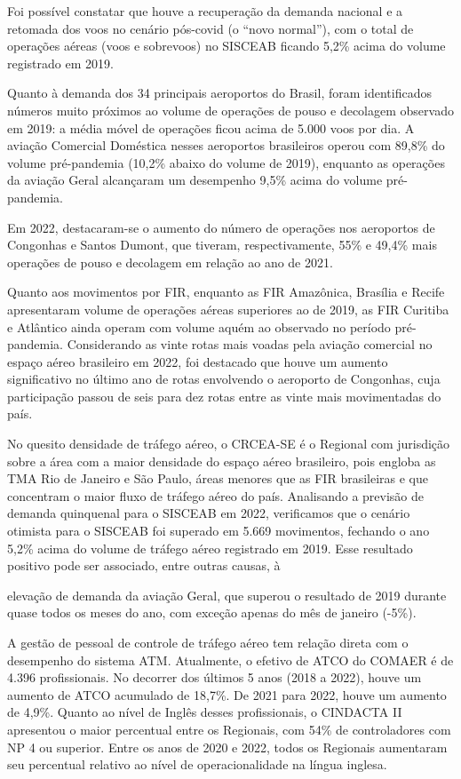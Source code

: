 \documentclass[
]{book}
\begin{document}
Foi possível constatar que houve a recuperação da demanda nacional e a retomada dos voos no cenário pós-covid (o ``novo normal''), com o total de operações aéreas (voos e sobrevoos) no SISCEAB ficando 5,2\% acima do volume registrado em 2019.

Quanto à demanda dos 34 principais aeroportos do Brasil, foram identificados números muito próximos ao volume de operações de pouso e decolagem observado em 2019: a média móvel de operações ficou acima de 5.000 voos por dia. A aviação Comercial Doméstica nesses aeroportos brasileiros operou com 89,8\% do volume pré-pandemia (10,2\% abaixo do volume de 2019), enquanto as operações da aviação Geral alcançaram um desempenho 9,5\% acima do volume pré-pandemia.

Em 2022, destacaram-se o aumento do número de operações nos aeroportos de Congonhas e Santos Dumont, que tiveram, respectivamente, 55\% e 49,4\% mais operações de pouso e decolagem em relação ao ano de 2021.

Quanto aos movimentos por FIR, enquanto as FIR Amazônica, Brasília e Recife apresentaram volume de operações aéreas superiores ao de 2019, as FIR Curitiba e Atlântico ainda operam com volume aquém ao observado no período pré-pandemia.
Considerando as vinte rotas mais voadas pela aviação comercial no espaço aéreo brasileiro em 2022, foi destacado que houve um aumento significativo no último ano de rotas envolvendo o aeroporto de Congonhas, cuja participação passou de seis para dez rotas entre as vinte mais movimentadas do país.

No quesito densidade de tráfego aéreo, o CRCEA-SE é o Regional com jurisdição sobre a área com a maior densidade do espaço aéreo brasileiro, pois engloba as TMA Rio de Janeiro e São Paulo, áreas menores que as FIR brasileiras e que concentram o maior fluxo de tráfego aéreo do país.
Analisando a previsão de demanda quinquenal para o SISCEAB em 2022, verificamos que o cenário otimista para o SISCEAB foi superado em 5.669 movimentos, fechando o ano 5,2\% acima do volume de tráfego aéreo registrado em 2019. Esse resultado positivo pode ser associado, entre outras causas, à

elevação de demanda da aviação Geral, que superou o resultado de 2019 durante quase todos os meses do ano, com exceção apenas do mês de janeiro (-5\%).

A gestão de pessoal de controle de tráfego aéreo tem relação direta com o desempenho do sistema ATM. Atualmente, o efetivo de ATCO do COMAER é de 4.396 profissionais. No decorrer dos últimos 5 anos (2018 a 2022), houve um aumento de ATCO acumulado de 18,7\%. De 2021 para 2022, houve um aumento de 4,9\%. Quanto ao nível de Inglês desses profissionais, o CINDACTA II apresentou o maior percentual entre os Regionais, com 54\% de controladores com NP 4 ou superior. Entre os anos de 2020 e 2022, todos os Regionais aumentaram seu percentual relativo ao nível de operacionalidade na língua inglesa.
\end{document}
